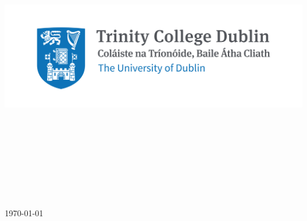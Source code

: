 \begin{titlepage}

\center %



\includegraphics{title/Trinity_RGB_transparent_main.png}\\[1cm] 
\ifdefined\school
\Large \textsc{\school} \\[1.5cm] %
\ifdefined\department
\large \department\\[1.5cm] %
\fi

\makeatletter
\textsc{{ \huge \bfseries \thesistitle}}\\[1.5cm] %
 


\ifdefined\authorid
\authorname\\ %
\authorid\\[2cm] %
\else
\textsc{\authorname}\\[2cm] %
\fi

\textsc{{\large \supervisor}}\\
\textsc{{\large \today}}\\[2cm] %


\end{titlepage}
